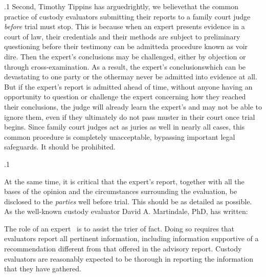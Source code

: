 \documentclass[11pt, twoside]{article}
\begin{document}
{\p.1{%
Second, Timothy Tippins has argued\mdash{}rightly, we believe\mdash{}that the common
practice of custody evaluators submitting their reports to a family
court judge \textit{before} trial must stop. This is because when an expert
presents evidence in a court of law, their credentials and their methods are subject to preliminary questioning before their testimony can be
admitted\mdash{}a procedure known as voir dire. Then the expert’s conclusions
may be challenged, either by objection or through cross-examination.
As a result, the expert’s conclusions\mdash{}which can be devastating to one
party or the other\mdash{}may never be admitted into evidence at all. But if
the expert’s report is admitted ahead of time, without anyone having an
opportunity to question or challenge the expert concerning how they
reached their conclusions,
the judge will already learn the expert’s  and may not be able
to ignore them, even if they ultimately do not pass muster in their court
once trial begins. Since family court judges act as juries as well in nearly
all cases, this common procedure is completely unacceptable, bypassing
important legal safeguards. It should be prohibited.
}%

\p.1{%
At the same time, it is critical that the expert’s report, together with
all the bases of the opinion and the circumstances surrounding the
evaluation, be disclosed to the \textit{parties} well before trial. This should be
as detailed as possible. As the well-known custody evaluator David A.
Martindale, PhD, has written:

\begin{blockQuote}
The role of an expert \ellThree{2pt}{2pt}\ is to assist the trier of fact. Doing so requires that evaluators report all pertinent information, including
information supportive of a recommendation different from that
offered in the advisory report. Custody evaluators are reasonably
expected to be thorough in reporting the information that they
have gathered.
\end{blockQuote}

}%

}
\end{document}
